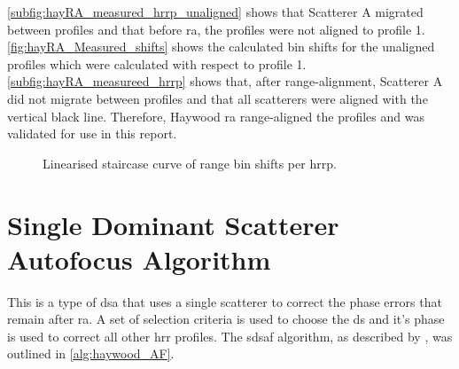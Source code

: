 \documentclass[class=report,11pt,crop=false]{standalone}
\begin{document}
    \autoref{subfig:hayRA_measured_hrrp_unaligned} shows that Scatterer A migrated between profiles and that before \gls{ra}, the profiles were not aligned to profile 1. \autoref{fig:hayRA_Measured_shifts} shows the calculated bin shifts for the unaligned profiles which were calculated with respect to profile 1. \autoref{subfig:hayRA_measureed_hrrp} shows that, after range-alignment, Scatterer A did not migrate between profiles and that all scatterers were aligned with the vertical black line. Therefore, Haywood \gls{ra} range-aligned the profiles and was validated for use in this report.
    
    \begin{figure}[H]
        \centering
        \resizebox{0.4\linewidth}{!}{}
        \caption{Linearised staircase curve of range bin shifts per \gls{hrrp}.\label{fig:hayRA_Measured_shifts}}
    \end{figure}

\section{Single Dominant Scatterer Autofocus Algorithm} \label{subsec:hayAF}

This is a type of \gls{dsa} that uses a single scatterer to correct the phase errors that remain after \gls{ra}. A set of selection criteria is used to choose the \gls{ds} and it's phase is used to correct all other \gls{hrr} profiles. The \gls{sdsaf} algorithm, as described by \cite{haywood_RA_AF}, was outlined in \autoref{alg:haywood_AF}.
\end{document}
